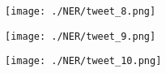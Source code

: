 \begin{figure}[h]
	\centering
	\texttt{[image: ./NER/tweet\_8.png]}
	\caption{}
	
\end{figure} 

\begin{figure}[h]
	\centering
	\texttt{[image: ./NER/tweet\_9.png]}
	\caption{}
	
\end{figure} 

\begin{figure}[h]
	\centering
	\texttt{[image: ./NER/tweet\_10.png]}
	\caption{}
	
\end{figure} 